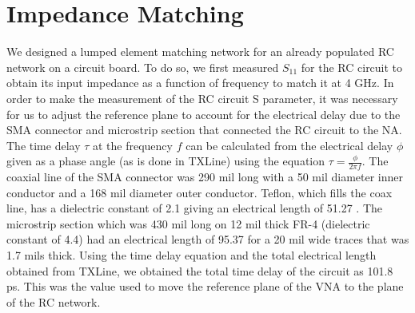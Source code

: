 \documentclass[twocolumn, aps, apl]{revtex4-1}
\begin{document}






\FloatBarrier

\section*{Impedance Matching}

We designed a lumped element matching network for an already populated RC network on a circuit board. To do so, we first measured $S_{11}$ for the RC circuit to obtain its input impedance as a function of frequency to match it at 4 GHz. In order to make the measurement of the RC circuit S parameter, it was necessary for us to adjust the reference plane to account for the electrical delay due to the SMA connector and microstrip section that connected the RC circuit to the NA. The time delay $\tau$ at the frequency $f$ can be calculated from the electrical delay $\phi$ given as a phase angle (as is done in TXLine) using the equation $\tau = \frac{\phi}{2 \pi f}$. The coaxial line of the SMA connector was 290 mil long with a 50 mil diameter inner conductor and a 168 mil diameter outer conductor. Teflon, which fills the coax line, has a dielectric constant of 2.1 giving an electrical length of 51.27 \textdegree. The microstrip section which was 430 mil long on 12 mil thick FR-4 (dielectric constant of 4.4) had an electrical length of 95.37 \textdegree for a 20 mil wide traces that was 1.7 mils thick. Using the time delay equation and the total electrical length obtained from TXLine, we obtained the total time delay of the circuit as 101.8 ps. This was the value used to move the reference plane of the VNA to the plane of the RC network.
\end{document}
